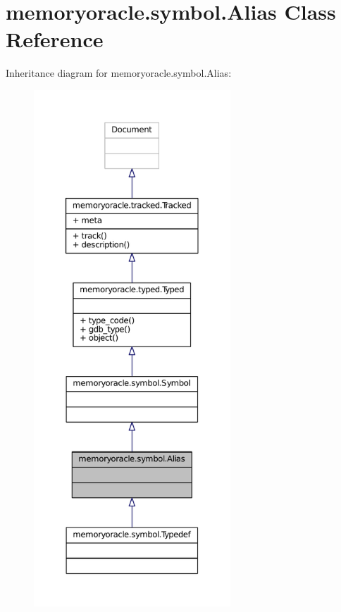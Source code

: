 \hypertarget{classmemoryoracle_1_1symbol_1_1Alias}{}\section{memoryoracle.\+symbol.\+Alias Class Reference}
\label{classmemoryoracle_1_1symbol_1_1Alias}


Inheritance diagram for memoryoracle.\+symbol.\+Alias\+:
\nopagebreak
\begin{figure}[H]
\begin{center}
\leavevmode
\includegraphics[height=550pt]{classmemoryoracle_1_1symbol_1_1Alias__inherit__graph}
\end{center}
\end{figure}


